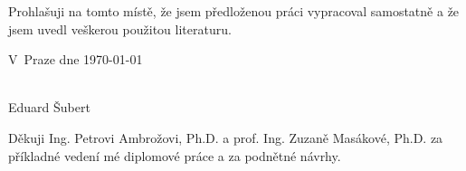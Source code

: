 \documentclass[a4paper,10pt,twoside]{report}
\theoremstyle{remark}
\begin{document}
\clearpage
\thispagestyle{empty}
\cleardoublepage

\thispagestyle{empty}



\vspace{0.5cm}

Prohlašuji na tomto místě, že jsem předloženou práci vypracoval samostatně 
a že jsem uvedl veškerou použitou literaturu.

\vspace{1.5cm}

\noindent
\begin{minipage}[b]{5cm}
V~Praze dne \today
\end{minipage}
\hfill
\begin{minipage}[t]{5cm}
\begin{center}
\dotfill\\
Eduard Šubert
\end{center}
\end{minipage}

\vspace*{2cm}


\clearpage
\thispagestyle{empty}
\cleardoublepage

\thispagestyle{empty}


Děkuji Ing. Petrovi Ambrožovi, Ph.D. a prof. Ing. Zuzaně Masákové, Ph.D. za příkladné vedení mé diplomové práce a za podnětné návrhy. 

\vspace*{2cm}


\clearpage
\thispagestyle{empty}
\cleardoublepage

\thispagestyle{empty}
\end{document}
